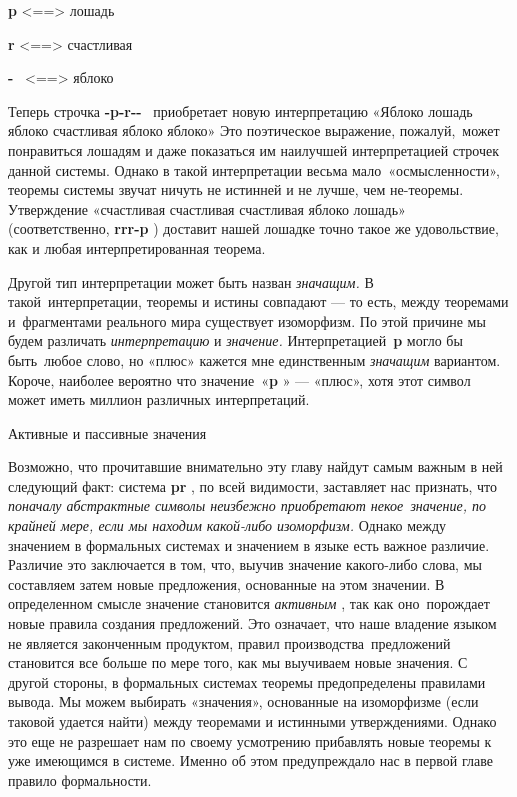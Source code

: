 \textbf{p} \textless==\textgreater{} лошадь

\textbf{r} \textless==\textgreater{} счастливая

\textbf{-} ~\textless==\textgreater{} яблоко

Теперь строчка \textbf{-p-r-\/-} ~приобретает новую интерпретацию «Яблоко лошадь яблоко счастливая яблоко яблоко» Это поэтическое выражение, пожалуй,~может понравиться лошадям и даже показаться им наилучшей интерпретацией строчек данной системы. Однако в такой интерпретации весьма мало~«осмысленности», теоремы системы звучат ничуть не истинней и не лучше, чем не-теоремы. Утверждение «счастливая счастливая счастливая яблоко лошадь» (соответственно, \textbf{rrr-p} ) доставит нашей лошадке точно такое же удовольствие, как и любая интерпретированная теорема.

Другой тип интерпретации может быть назван \emph{значащим.} В такой~интерпретации, теоремы и истины совпадают --- то есть, между теоремами и~фрагментами реального мира существует изоморфизм. По этой причине мы будем различать \emph{интерпретацию} и \emph{значение.} Интерпретацией~\textbf{p} могло бы быть~любое слово, но «плюс» кажется мне единственным \emph{значащим} вариантом. Короче, наиболее вероятно что значение~«\textbf{p} » --- «плюс», хотя этот символ может иметь миллион различных интерпретаций.

Активные и пассивные значения

Возможно, что прочитавшие внимательно эту главу найдут самым важным в ней следующий факт: система \textbf{pr} , по всей видимости, заставляет нас признать, что \emph{поначалу абстрактные символы неизбежно приобретают некое~значение, по крайней мере, если мы находим какой-либо изоморфизм.} Однако между значением в формальных системах и значением в языке есть важное различие. Различие это заключается в том, что, выучив значение какого-либо слова, мы составляем затем новые предложения, основанные на этом значении. В определенном смысле значение становится \emph{активным} , так как оно~порождает новые правила создания предложений. Это означает, что наше владение языком не является законченным продуктом, правил производства~предложений становится все больше по мере того, как мы выучиваем новые значения. С другой стороны, в формальных системах теоремы предопределены правилами вывода. Мы можем выбирать «значения», основанные на изоморфизме (если таковой удается найти) между теоремами и истинными утверждениями. Однако это еще не разрешает нам по своему усмотрению прибавлять новые теоремы к уже имеющимся в системе. Именно об этом предупреждало нас в первой главе правило формальности.

